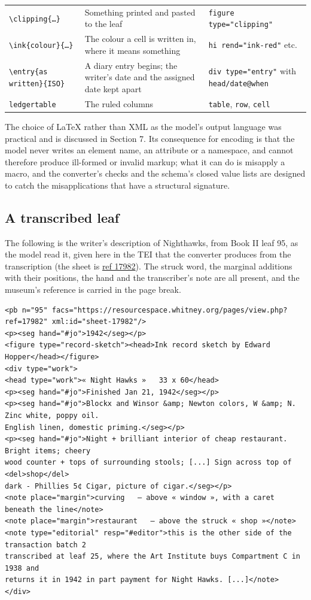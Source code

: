 \documentclass[11pt]{article}
\newcommand{\lf}[3]{\href{https://hopper.commutator.io/#1/\##1/leaf-#2}{#3}}
\begin{document}
\begin{table}[htbp]
\begin{tabular}{lp{6.2cm}l}
\texttt{\textbackslash clipping\{…\}} & Something printed and pasted to the leaf & \texttt{figure type="clipping"}\\
\texttt{\textbackslash ink\{colour\}\{…\}} & The colour a cell is written in, where it means something & \texttt{hi rend="ink-red"} etc.\\
\texttt{\textbackslash entry\{as written\}\{ISO\}} & A diary entry begins; the writer's date and the assigned date kept apart & \texttt{div type="entry"} with \texttt{head/date@when}\\
\texttt{ledgertable} & The ruled columns & \texttt{table}, \texttt{row}, \texttt{cell}\\\bottomrule
\end{tabular}
\end{table}

The choice of LaTeX rather than XML as the model's output language was practical and is discussed in Section 7. Its consequence for encoding is that the model never writes an element name, an attribute or a namespace, and cannot therefore produce ill-formed or invalid markup; what it can do is misapply a macro, and the converter's checks and the schema's closed value lists are designed to catch the misapplications that have a structural signature.

\subsection{A transcribed leaf}

The following is the writer's description of Nighthawks, from Book II leaf 95, as the model read it, given here in the TEI that the converter produces from the transcription (the sheet is \lf{book-ii}{95}{ref 17982}). The struck word, the marginal additions with their positions, the hand and the transcriber's note are all present, and the museum's reference is carried in the page break.

\begin{lstlisting}
<pb n="95" facs="https://resourcespace.whitney.org/pages/view.php?ref=17982" xml:id="sheet-17982"/>
<p><seg hand="#jo">1942</seg></p>
<figure type="record-sketch"><head>Ink record sketch by Edward Hopper</head></figure>
<div type="work">
<head type="work">« Night Hawks »   33 x 60</head>
<p><seg hand="#jo">Finished Jan 21, 1942</seg></p>
<p><seg hand="#jo">Blockx and Winsor &amp; Newton colors, W &amp; N. Zinc white, poppy oil.
English linen, domestic priming.</seg></p>
<p><seg hand="#jo">Night + brilliant interior of cheap restaurant. Bright items; cheery
wood counter + tops of surrounding stools; [...] Sign across top of <del>shop</del>
dark - Phillies 5¢ Cigar, picture of cigar.</seg></p>
<note place="margin">curving   — above « window », with a caret beneath the line</note>
<note place="margin">restaurant   — above the struck « shop »</note>
<note type="editorial" resp="#editor">this is the other side of the transaction batch 2
transcribed at leaf 25, where the Art Institute buys Compartment C in 1938 and
returns it in 1942 in part payment for Night Hawks. [...]</note>
</div>
\end{lstlisting}
\end{document}
